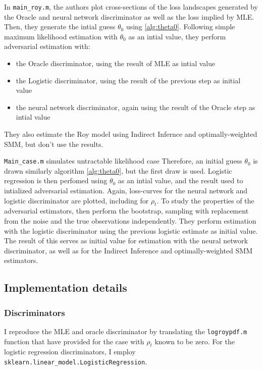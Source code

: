 In \texttt{main\_roy.m}, the authors plot cross-sections of the loss landscapes generated by the Oracle and neural network discriminator as well as the loss implied by MLE. %
Then, they generate the intial guess $\theta_0$ using \ref{alg:theta0}.
Following simple maximum likelihood estimation with $\theta_0$ as an intial value, they perform adversarial estimation with:
\begin{itemize}
    \item the Oracle discriminator, using the result of MLE as intial value
    \item the Logistic discriminator, using the result of the previous step as initial value
    \item the neural network discriminator, again using the result of the Oracle step as intial value
\end{itemize} 
They also estimate the Roy model using Indirect Infernce and optimally-weighted SMM, but don't use the results.

\texttt{Main\_case.m} simulates untractable likelihood case
Therefore, an initial guess $\theta_0$ is drawn similarly algorithm \ref{alg:theta0}, but the first draw is used.
Logistic regression is then perfomed using $\theta_0$ as an intial value, and the result used to intialized adversarial estimation. %
Again, loss-curves for the neural network and logistic discriminator are plotted, including for $\rho_t$.
To study the properties of the adversarial estimators, \textcite{kaji2023adversarial} then perform the bootstrap, sampling with replacement from the noise and the true observations independently.
They perform estimation with the logistic discriminator using the previous logistic estimate as initial value.
The result of this serves as initial value for estimation with the neural network discriminator, as well as for the Indirect Inference and optimally-weighted SMM estimators.



\subsection{Implementation details}
\label{sec:Implementation}

\subsubsection{Discriminators}

I reproduce the MLE and oracle discriminator by translating the \texttt{logroypdf.m} function that \textcite{kaji2023adversarial} have provided for the case with $\rho_t$ known to be zero.
For the logistic regression discriminators, I employ \texttt{sklearn.linear\_model.LogisticRegression}.


